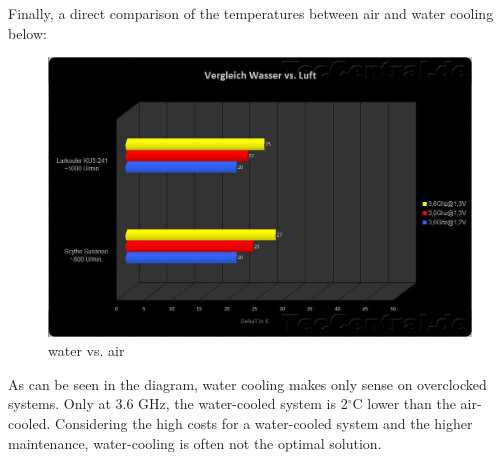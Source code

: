Finally, a direct comparison of the temperatures between air and water cooling below:
\begin{figure}[H]
  \centering
  \includegraphics[width=.9\textwidth]{./graphics/water_vs_air.jpg}
  \caption{water vs. air\\}
  \label{fig:water_air}
\end{figure}
As can be seen in the diagram, water cooling makes only sense on overclocked systems. Only at 3.6 GHz, the water-cooled system is 2$^\circ$C lower than the air-cooled.
Considering the high costs for a water-cooled system and the higher maintenance, water-cooling is often not the optimal solution.


